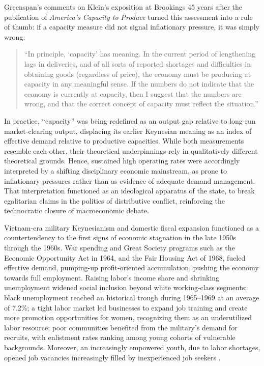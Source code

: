 \documentclass[11pt]{article}
\begin{document}
Greenspan's comments on Klein's exposition at Brookings 45 years after the publication of \emph{America's Capacity to Produce} turned this assessment into a rule of thumb: if a capacity measure did not signal inflationary pressure, it was simply wrong:
\begin{quote}
``In principle, `capacity' has meaning. In the current period of lengthening lags in deliveries, and of all sorts of reported shortages and difficulties in obtaining goods (regardless of price), the economy must be producing at capacity in any meaningful sense. If the numbers do not indicate that the economy is currently at capacity, then I suggest that the numbers are wrong, and that the correct concept of capacity must reflect the situation.'' \citep[p.~758]{kleinetal1973}
\end{quote}
In practice, ``capacity'' was being redefined as an output gap relative to long-run market-clearing output, displacing its earlier Keynesian meaning as an index of effective demand relative to productive capacities. While both measurements resemble each other, their theoretical underpinnings rely in qualitatively different theoretical grounds. Hence, sustained high operating rates were accordingly interpreted by a shifting disciplinary economic mainstream, as prone to inflationary pressures rather than as evidence of adequate demand management. That interpretation functioned as an ideological apparatus of the state, to break egalitarian claims in the politics of distributive conflict, reinforcing the technocratic closure of macroeconomic debate.

Vietnam-era military Keynesianism and domestic fiscal expansion functioned as a countertendency to the first signs of economic stagnation in the late 1950s through the 1960s. War spending and Great Society programs such as the Economic Opportunity Act in 1964, and the Fair Housing Act of 1968, fueled effective demand, pumping-up profit-oriented accumulation, pushing the economy towards full employment. Raising labor's income share and shrinking unemployment widened social inclusion beyond white working-class segments: black unemployment reached an historical trough during 1965--1969 at an average of 7.2\%; a tight labor market led businesses to expand job training and create more promotion opportunities for women, recognizing them as an underutilized labor resource; poor communities benefited from the military's demand for recruits, with enlistment rates ranking among young cohorts of vulnerable backgrounds. Moreover, an increasingly empowered youth, due to labor shortages, opened job vacancies increasingly filled by inexperienced job seekers \citep{bakerpollinzahrt1996}.
\end{document}
